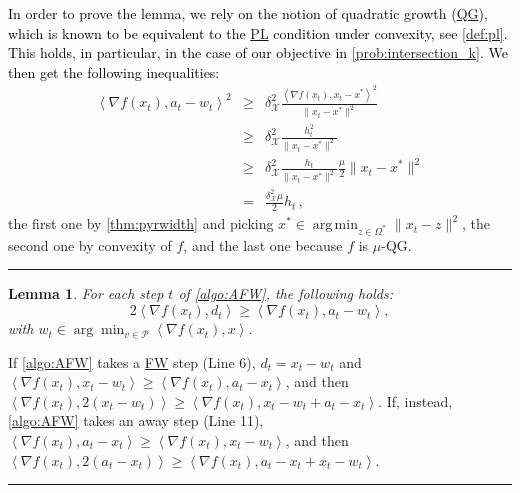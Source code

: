 \documentclass{article}
\makeatletter
\newcommand{\R}{\mathbb{R}}
\newcommand\linkofproof[1]{\textbf{of \cref{#1}. }\newtarget{proof:#1}}
\newcommand{\jmlrBlackBox}{\rule{1.5ex}{1.5ex}}
\newcommand{\jmlrQED}{\hfill\jmlrBlackBox\par\bigskip}
\providecommand{\proofname}{Proof}
\renewenvironment{proof}%
{%
 \par\noindent{\bfseries\upshape \proofname\ }%
}%
{\jmlrQED}
\newcommand{\mP}{\mathcal{P}}
\newcommand{\mX}{\mathcal{X}}
\newcommand{\innp}[1]{\left\langle #1 \right\rangle}
\DeclareMathOperator*{\argmin}{\mathrm{arg\,min}}
\newcommand{\defi}{\stackrel{\mathrm{\scriptscriptstyle def}}{=}}
\newtheorem{lemma}[theorem]{Lemma}
\newif\ifTODO
\newcommand{\dav}[1]{\ifTODO \todo[size=\scriptsize, color=yellow]{DM: #1}{} \fi}
\newcommand{\gabrev}[1]{\textcolor{black}{#1}}
\newcommand\newlink[2]{\hyperlink{#1}{\normalcolor #2}}
\newcommand\newtarget[2]{\Hy@raisedlink{\hypertarget{#1}{}}#2}
\newcommand{\PL}{\newlink{def:acronym_polyak_lojasiewicz}{PL}}
\newcommand{\QG}{\newlink{def:acronym_quadratic_growth}{QG}}
\newcommand{\FW}{\newlink{def:acronym_frank_wolfe}{FW}}
\makeatother
\begin{document}
%
\begin{proof}%
\gabrev{
In order to prove the lemma, we rely on the notion of quadratic growth (\QG{}), which is known to be equivalent to the \PL{} condition under convexity, see \cref{def:pl}.
This holds, in particular, in the case of our objective in \cref{prob:intersection_k}.
We then get the following inequalities:}
\begin{equation}
\begin{array}{rcl}
%
\innp{\nabla f(x_t), a_t - w_t}^2 &\ge & \delta_\mX^2\frac{\innp{\nabla f(x_t), x_t - x^\ast}^2}{\|x_t - x^\ast\|^2}\\
%
&\ge & \delta_\mX^2\frac{ h_t^2}{\|x_t - x^\ast\|^2}\\
%
&\ge& \delta_\mX^2\frac{ h_t}{\|x_t - x^\ast\|^2} \frac{\mu}{2}\|x_t - x^\ast\|^2\\
%
& = & \frac{\delta_\mX^2 \mu}{2}h_t\,,
\end{array}
\end{equation}
the first one by \cref{thm:pyrwidth} and picking $x^\ast \in \argmin_{z \in \Omega^\ast} \|x_t - z\|^2$, the second one by convexity of $f$, and the last one because $f$ is $\mu$-QG.
\end{proof}

\begin{lemma}\label{lemma:d_bound}
For each step $t$ of \cref{algo:AFW}, the following holds:
\[
2 \innp{\nabla f(x_t), d_t} \ge \innp{\nabla f(x_t), a_t - w_t},
\]
with $w_t \in \arg\min_{v \in \mP} \innp{\nabla f(x_t), x}$.
\end{lemma}
\begin{proof}
If \cref{algo:AFW} takes a \FW{} step (Line 6), $d_t = x_t - w_t$ and $\innp{\nabla f(x_t), x_t - w_t} \ge \innp{\nabla f(x_t), a_t - x_t}$, and then $\innp{\nabla f(x_t), 2(x_t - w_t)} \ge \innp{\nabla f(x_t), x_t - w_t + a_t - x_t}$.
If, instead, \cref{algo:AFW} takes an away step (Line 11), $\innp{\nabla f(x_t), a_t - x_t} \ge \innp{\nabla f(x_t), x_t - w_t}$, and then $\innp{\nabla f(x_t), 2(a_t - x_t)} \ge \innp{\nabla f(x_t), a_t - x_t + x_t - w_t}$.
\end{proof}
\end{document}
